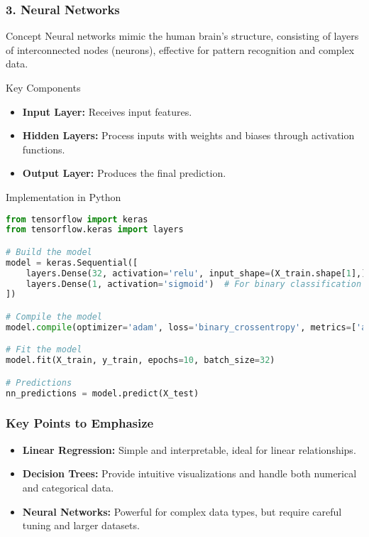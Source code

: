 \documentclass[aspectratio=169]{beamer}
\begin{document}
\begin{frame}[fragile]
    \frametitle{3. Neural Networks}
    \begin{block}{Concept}
        Neural networks mimic the human brain's structure, consisting of layers of interconnected nodes (neurons), effective for pattern recognition and complex data.
    \end{block}

    \begin{block}{Key Components}
        \begin{itemize}
            \item \textbf{Input Layer:} Receives input features.
            \item \textbf{Hidden Layers:} Process inputs with weights and biases through activation functions.
            \item \textbf{Output Layer:} Produces the final prediction.
        \end{itemize}
    \end{block}
    
    \begin{block}{Implementation in Python}
    \begin{lstlisting}[language=Python, frame=single]
from tensorflow import keras
from tensorflow.keras import layers

# Build the model
model = keras.Sequential([
    layers.Dense(32, activation='relu', input_shape=(X_train.shape[1],)),
    layers.Dense(1, activation='sigmoid')  # For binary classification
])

# Compile the model
model.compile(optimizer='adam', loss='binary_crossentropy', metrics=['accuracy'])

# Fit the model
model.fit(X_train, y_train, epochs=10, batch_size=32)

# Predictions
nn_predictions = model.predict(X_test)
    \end{lstlisting}
    \end{block}
\end{frame}

\begin{frame}
    \frametitle{Key Points to Emphasize}
    \begin{itemize}
        \item \textbf{Linear Regression:} Simple and interpretable, ideal for linear relationships.
        \item \textbf{Decision Trees:} Provide intuitive visualizations and handle both numerical and categorical data.
        \item \textbf{Neural Networks:} Powerful for complex data types, but require careful tuning and larger datasets.
    \end{itemize}
\end{frame}
\end{document}
